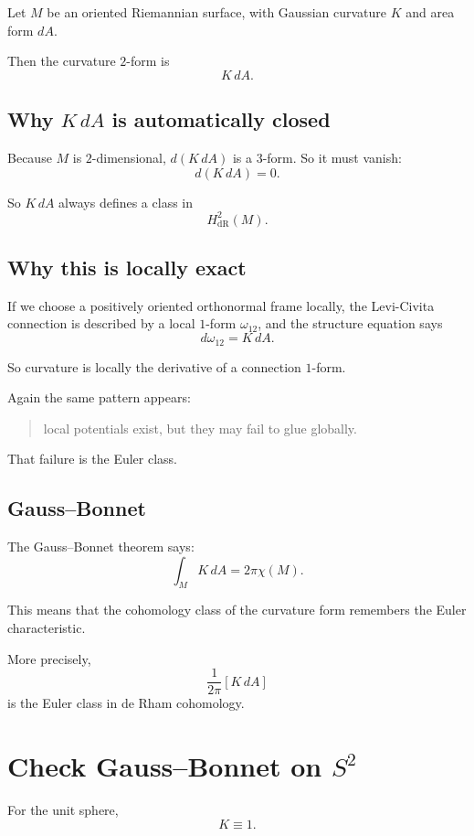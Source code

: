 \documentclass[11pt]{article}
\begin{document}
	Let \(M\) be an oriented Riemannian surface, with Gaussian curvature \(K\) and area form \(dA\).
	
	Then the curvature \(2\)-form is
	\[
	K\,dA.
	\]
	
	\subsection{Why \(K\,dA\) is automatically closed}
	
	Because \(M\) is \(2\)-dimensional, \(d(K\,dA)\) is a \(3\)-form. So it must vanish:
	\[
	d(K\,dA)=0.
	\]
	
	So \(K\,dA\) always defines a class in
	\[
	H^2_{\mathrm{dR}}(M).
	\]
	
	\subsection{Why this is locally exact}
	
	If we choose a positively oriented orthonormal frame locally, the Levi-Civita connection is described by a local \(1\)-form \(\omega_{12}\), and the structure equation says
	\[
	d\omega_{12}=K\,dA.
	\]
	
	So curvature is locally the derivative of a connection \(1\)-form.
	
	Again the same pattern appears:
	
	\begin{quote}
		local potentials exist, but they may fail to glue globally.
	\end{quote}
	
	That failure is the Euler class.
	
	\subsection{Gauss--Bonnet}
	
	The Gauss--Bonnet theorem says:
	\[
	\int_M K\,dA=2\pi\chi(M).
	\]
	
	This means that the cohomology class of the curvature form remembers the Euler characteristic.
	
	More precisely,
	\[
	\frac{1}{2\pi}[K\,dA]
	\]
	is the Euler class in de Rham cohomology.
	
	\section{Check Gauss--Bonnet on \(S^2\)}
	
	For the unit sphere,
	\[
	K\equiv 1.
	\]
	
\end{document}
